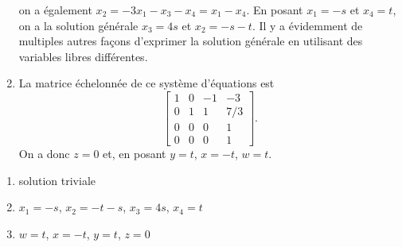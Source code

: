 \begin{exercice}
\begin{sol}
\begin{enumerate}
      on a également $x_2 = -3 x_1 - x_3 - x_4 = x_1 - x_4$. En
      posant $x_1 = -s$ et $x_4 = t$, on a la solution générale $x_3
      = 4 s$ et $x_2 = -s - t$. Il y a évidemment de multiples autres
      façons d'exprimer la solution générale en utilisant des
      variables libres différentes.
    \item La matrice échelonnée de ce système d'équations est
      \begin{displaymath}
        \begin{bmatrix}
          1 & 0 & -1 &  -3 \\
          0 & 1 &  1 & 7/3 \\
          0 & 0 &  0 &   1 \\
          0 & 0 &  0 &   1
        \end{bmatrix}.
      \end{displaymath}
      On a donc $z = 0$ et, en posant $y = t$, $x = -t$, $w = t$.
    \end{enumerate}
  \end{sol}
  \begin{rep}
    \begin{enumerate}
    \item solution triviale
    \item $x_1 = -s$, $x_2 = -t - s$, $x_3 = 4s$, $x_4 = t$
    \item $w = t$, $x = -t$, $y = t$, $z = 0$
    \end{enumerate}
  \end{rep}
\end{exercice}

